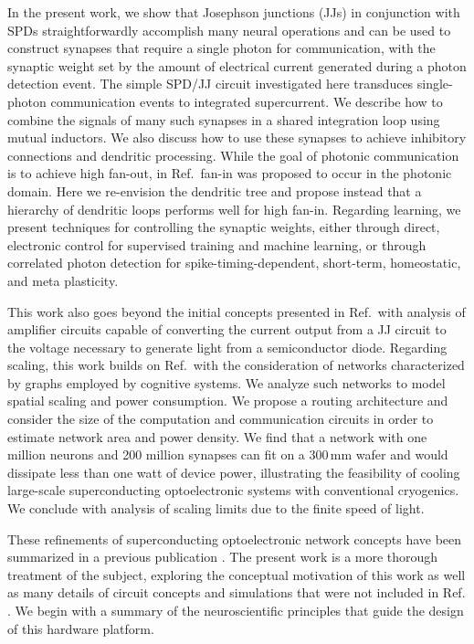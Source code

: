 \documentclass[twocolumn]{article}
\newcommand{\onlinecite}[1]{\hspace{-1 ex} \nocite{#1}\citenum{#1}}
\begin{document}
In the present work, we show that Josephson junctions (JJs) in conjunction with SPDs straightforwardly accomplish many neural operations and can be used to construct synapses that require a single photon for communication, with the synaptic weight set by the amount of electrical current generated during a photon detection event. The simple SPD/JJ circuit investigated here transduces single-photon communication events to integrated supercurrent. We describe how to combine the signals of many such synapses in a shared integration loop using mutual inductors. We also discuss how to use these synapses to achieve inhibitory connections and dendritic processing. While the goal of photonic communication is to achieve high fan-out, in Ref.\,\onlinecite{shbu2017} fan-in was proposed to occur in the photonic domain. Here we re-envision the dendritic tree and propose instead that a hierarchy of dendritic loops performs well for high fan-in. Regarding learning, we present techniques for controlling the synaptic weights, either through direct, electronic control for supervised training and machine learning, or through correlated photon detection for spike-timing-dependent, short-term, homeostatic, and meta plasticity. 

This work also goes beyond the initial concepts presented in Ref.\,\onlinecite{shbu2017} with analysis of amplifier circuits capable of converting the current output from a JJ circuit to the voltage necessary to generate light from a semiconductor diode. Regarding scaling, this work builds on Ref.\,\onlinecite{shbu2017} with the consideration of networks characterized by graphs employed by cognitive systems. We analyze such networks to model spatial scaling and power consumption. We propose a routing architecture and consider the size of the computation and communication circuits in order to estimate network area and power density. We find that a network with one million neurons and 200 million synapses can fit on a 300\,mm wafer and would dissipate less than one watt of device power, illustrating the feasibility of cooling large-scale superconducting optoelectronic systems with conventional cryogenics. We conclude with analysis of scaling limits due to the finite speed of light.

These refinements of superconducting optoelectronic network concepts have been summarized in a previous publication \cite{sh2018}. The present work is a more thorough treatment of the subject, exploring the conceptual motivation of this work as well as many details of circuit concepts and simulations that were not included in Ref.\,\onlinecite{sh2018}. We begin with a summary of the neuroscientific principles that guide the design of this hardware platform.
\end{document}
